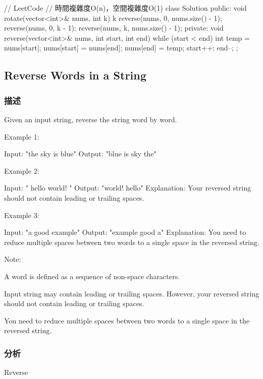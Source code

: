 \begin{Code}
// LeetCode
// 時間複雜度O(n)，空間複雜度O(1)
class Solution {
public:
    void rotate(vector<int>& nums, int k) {
        k %
        reverse(nums, 0, nums.size() - 1);
        reverse(nums, 0, k - 1);
        reverse(nums, k, nums.size() - 1);
    }
private:
    void reverse(vector<int>& nums, int start, int end) {
        while (start < end) {
            int temp = nums[start];
            nums[start] = nums[end];
            nums[end] = temp;
            start++;
            end--;
        }
    }
};
\end{Code}


\subsection{Reverse Words in a String}
\label{sec:reverse-words-in-a-string}

\subsubsection{描述}
Given an input string, reverse the string word by word.

Example 1:
\begin{Code}
Input: "the sky is blue"
Output: "blue is sky the"
\end{Code}

Example 2:
\begin{Code}
Input: "  hello world!  "
Output: "world! hello"
Explanation: Your reversed string should not contain leading or trailing spaces.
\end{Code}

Example 3:
\begin{Code}
Input: "a good   example"
Output: "example good a"
Explanation: You need to reduce multiple spaces between two words to a single space in the reversed string.
\end{Code}

Note:
\begindot
\item A word is defined as a sequence of non-space characters.
\item Input string may contain leading or trailing spaces. However,
      your reversed string should not contain leading or trailing spaces.
\item You need to reduce multiple spaces between two words to a single space in the reversed string.
\myenddot

\subsubsection{分析}
Reverse

